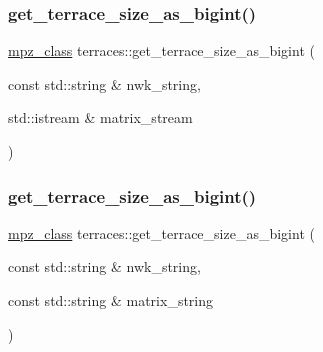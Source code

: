 \subsubsection{\texorpdfstring{get\+\_\+terrace\+\_\+size\+\_\+as\+\_\+bigint()}{get\_terrace\_size\_as\_bigint()}\hspace{0.1cm}{\footnotesize\ttfamily [3/4]}}
{\footnotesize\ttfamily \hyperlink{gmpxx_8h_a4194ba637e08ba88fb6b56747cc0ee6c}{mpz\+\_\+class} terraces\+::get\+\_\+terrace\+\_\+size\+\_\+as\+\_\+bigint (\begin{DoxyParamCaption}\item[{const std\+::string \&}]{nwk\+\_\+string,  }\item[{std\+::istream \&}]{matrix\+\_\+stream }\end{DoxyParamCaption})}

\mbox{\label{namespaceterraces_a77a2041cec698021d4513fe8582295d2}} 
\subsubsection{\texorpdfstring{get\+\_\+terrace\+\_\+size\+\_\+as\+\_\+bigint()}{get\_terrace\_size\_as\_bigint()}\hspace{0.1cm}{\footnotesize\ttfamily [4/4]}}
{\footnotesize\ttfamily \hyperlink{gmpxx_8h_a4194ba637e08ba88fb6b56747cc0ee6c}{mpz\+\_\+class} terraces\+::get\+\_\+terrace\+\_\+size\+\_\+as\+\_\+bigint (\begin{DoxyParamCaption}\item[{const std\+::string \&}]{nwk\+\_\+string,  }\item[{const std\+::string \&}]{matrix\+\_\+string }\end{DoxyParamCaption})}

\mbox{\label{namespaceterraces_a2fd8367ac496d3302518b44ad2804e0a}} 
